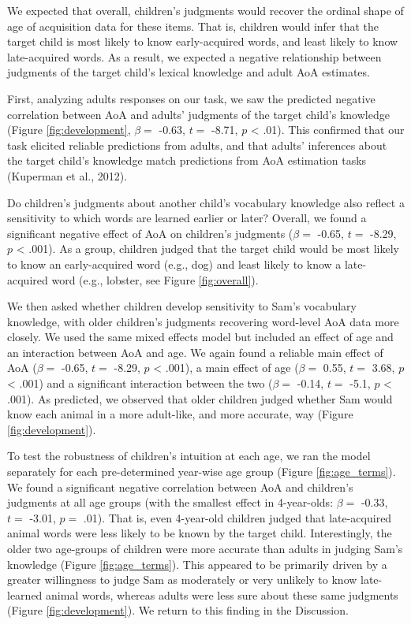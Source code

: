 \documentclass[10pt, letterpaper]{article}
\begin{document}
We expected that overall, children's judgments would recover the ordinal
shape of age of acquisition data for these items. That is, children
would infer that the target child is most likely to know early-acquired
words, and least likely to know late-acquired words. As a result, we
expected a negative relationship between judgments of the target child's
lexical knowledge and adult AoA estimates.

First, analyzing adults responses on our task, we saw the predicted
negative correlation between AoA and adults' judgments of the target
child's knowledge (Figure \ref{fig:development}, \(\beta =\) -0.63,
\(t =\) -8.71, \(p\) \textless{} .01). This confirmed that our task
elicited reliable predictions from adults, and that adults' inferences
about the target child's knowledge match predictions from AoA estimation
tasks (Kuperman et al., 2012).

Do children's judgments about another child's vocabulary knowledge also
reflect a sensitivity to which words are learned earlier or later?
Overall, we found a significant negative effect of AoA on children's
judgments (\(\beta =\) -0.65, \(t =\) -8.29, \(p\) \textless{} .001). As
a group, children judged that the target child would be most likely to
know an early-acquired word (e.g., dog) and least likely to know a
late-acquired word (e.g., lobster, see Figure \ref{fig:overall}).

We then asked whether children develop sensitivity to Sam's vocabulary
knowledge, with older children's judgments recovering word-level AoA
data more closely. We used the same mixed effects model but included an
effect of age and an interaction between AoA and age. We again found a
reliable main effect of AoA (\(\beta =\) -0.65, \(t =\) -8.29, \(p\)
\textless{} .001), a main effect of age (\(\beta =\) 0.55, \(t =\) 3.68,
\(p\) \textless{} .001) and a significant interaction between the two
(\(\beta =\) -0.14, \(t =\) -5.1, \(p\) \textless{} .001). As predicted,
we observed that older children judged whether Sam would know each
animal in a more adult-like, and more accurate, way (Figure
\ref{fig:development}).

To test the robustness of children's intuition at each age, we ran the
model separately for each pre-determined year-wise age group (Figure
\ref{fig:age_terms}). We found a significant negative correlation
between AoA and children's judgments at all age groups (with the
smallest effect in 4-year-olds: \(\beta =\) -0.33, \(t =\) -3.01,
\(p =\) .01). That is, even 4-year-old children judged that
late-acquired animal words were less likely to be known by the target
child. Interestingly, the older two age-groups of children were more
accurate than adults in judging Sam's knowledge (Figure
\ref{fig:age_terms}). This appeared to be primarily driven by a greater
willingness to judge Sam as moderately or very unlikely to know
late-learned animal words, whereas adults were less sure about these
same judgments (Figure \ref{fig:development}). We return to this finding
in the Discussion.
\end{document}
